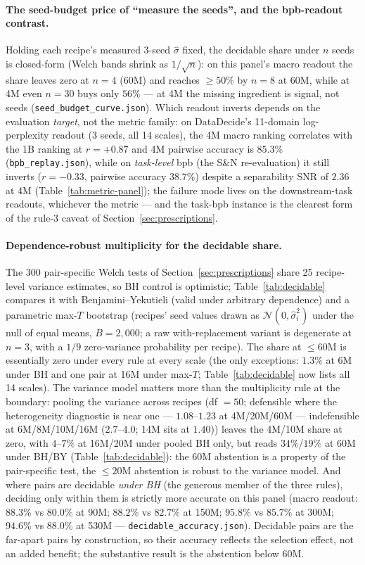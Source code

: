 \paragraph{The seed-budget price of ``measure the seeds'', and the bpb-readout contrast.}
Holding each recipe's measured 3-seed $\hat\sigma$ fixed, the decidable share under $n$ seeds
is closed-form (Welch bands shrink as $1/\sqrt{n}$): on this panel's macro readout the share
leaves zero at $n = 4$ (60M) and reaches ${\ge}50\%$ by $n = 8$ at 60M, while at 4M even
$n = 30$ buys only $56\%$ --- at 4M the missing ingredient is signal, not seeds
(\texttt{seed\_budget\_curve.json}). Which readout inverts depends on the evaluation \emph{target},
not the metric family: on DataDecide's 11-domain log-perplexity readout (3 seeds, all 14
scales), the 4M macro
ranking correlates with the 1B ranking at $r = +0.87$ and 4M pairwise accuracy is $85.3\%$
(\texttt{bpb\_replay.json}), while on \emph{task-level} bpb (the S\&N re-evaluation) it
still inverts ($r = -0.33$, pairwise accuracy $38.7\%$) despite a separability SNR of $2.36$
at 4M (Table~\ref{tab:metric-panel}); the failure mode lives on the downstream-task readouts,
whichever the metric --- and the task-bpb instance is the clearest form of
the rule-3 caveat of Section~\ref{sec:prescriptions}.

\paragraph{Dependence-robust multiplicity for the decidable share.}
The 300 pair-specific Welch tests of Section~\ref{sec:prescriptions} share 25 recipe-level
variance estimates, so BH control is optimistic; Table~\ref{tab:decidable} compares it with
Benjamini--Yekutieli (valid under arbitrary dependence) and a parametric max-$T$ bootstrap
(recipes' seed values drawn as $\mathcal{N}(0, \hat\sigma_i^2)$ under the null of equal means,
$B = 2{,}000$; a raw with-replacement variant is degenerate at $n = 3$, with a $1/9$
zero-variance probability per recipe). The share at ${\le}60$M is essentially zero under
every rule at every scale (the only exceptions: $1.3\%$ at 6M under BH and one pair at 16M
under max-$T$; Table~\ref{tab:decidable} now lists all 14 scales).
The variance model matters more than the multiplicity rule at the boundary: pooling the
variance across recipes (df $= 50$; defensible where the heterogeneity diagnostic is near
one --- $1.08$--$1.23$ at 4M/20M/60M --- indefensible at 6M/8M/10M/16M ($2.7$--$4.0$; 14M sits at $1.40$)) leaves the
4M/10M share at zero, with $4$--$7\%$ at 16M/20M under pooled BH only, but reads $34\%$/$19\%$ at 60M under
BH/BY (Table~\ref{tab:decidable}): the 60M abstention is a property of the pair-specific
test, the ${\le}20$M abstention is robust to the variance model.
And where pairs are decidable \emph{under BH} (the generous member of the three rules),
deciding only within them is strictly more accurate on this
panel (macro readout: $88.3\%$ vs $80.0\%$ at 90M; $88.2\%$ vs $82.7\%$ at 150M; $95.8\%$ vs
$85.7\%$ at 300M; $94.6\%$ vs $88.0\%$ at 530M ---
\texttt{decidable\_accuracy.json}). Decidable pairs are the far-apart pairs by
construction, so their accuracy reflects the selection effect, not an added
benefit; the substantive result is the abstention below 60M.

